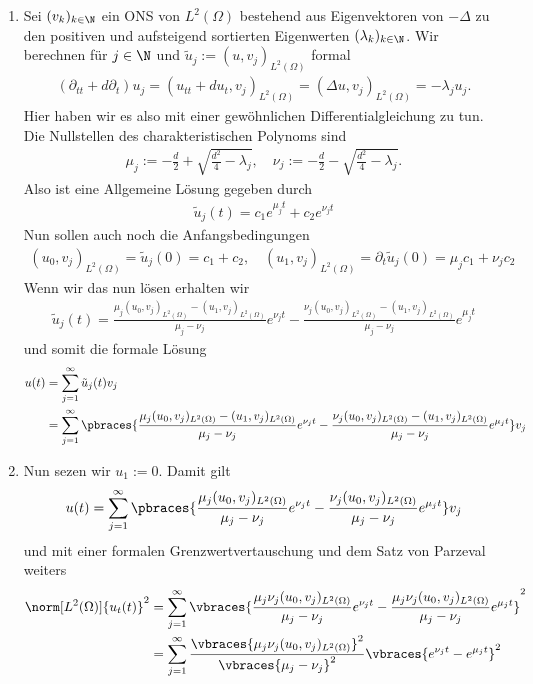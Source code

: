 \begin{solution}
\begin{enumerate}[label = (\roman*)]
    \item Sei $(v_k)_{k \in \N}$ ein ONS von $L^2(\Omega)$ bestehend aus Eigenvektoren von $- \Delta $ zu den positiven und aufsteigend sortierten Eigenwerten $(\lambda_k)_{k \in \N}$. Wir berechnen für $j \in \N$ und $\tilde{u}_j := (u,v_j)_{L^2(\Omega)}$ formal 
    \begin{align*}
    	(\partial_{tt} + d \partial_t)u_j = (u_{tt} + du_t, v_j)_{L^2(\Omega)} = (\Delta u, v_j)_{L^2(\Omega)} = -\lambda_j u_j.
    \end{align*}
	Hier haben wir es also mit einer gewöhnlichen Differentialgleichung zu tun. Die Nullstellen des charakteristischen Polynoms sind
	\begin{align*}
		\mu_j := - \frac{d}{2} + \sqrt{\frac{d^2}{4} - \lambda_j}, \quad \nu_j := - \frac{d}{2} - \sqrt{\frac{d^2}{4} - \lambda_j}.
	\end{align*}
	Also ist eine Allgemeine Lösung gegeben durch
	\begin{align*}
		\tilde{u}_j(t) = c_1 e^{\mu_j t} + c_2 e^{\nu_j t}
	\end{align*}
	Nun sollen auch noch die Anfangsbedingungen
	\begin{align*}
		(u_0, v_j)_{L^2(\Omega)} = \tilde{u}_j(0) = c_1 + c_2, \quad (u_1, v_j)_{L^2(\Omega)} = \partial_t \tilde{u}_j(0) = \mu_j c_1 + \nu_j c_2
	\end{align*}
	Wenn wir das nun lösen erhalten wir
	\begin{align*}
		\tilde{u}_j(t) = \frac{\mu_j(u_0, v_j)_{L^2(\Omega)} - (u_1, v_j)_{L^2(\Omega)}}{\mu_j - \nu_j} e^{\nu_j t} - \frac{\nu_j(u_0, v_j)_{L^2(\Omega)} - (u_1, v_j)_{L^2(\Omega)}}{\mu_j - \nu_j} e^{\mu_j t}
	\end{align*}
	und somit die formale Lösung
	\begin{align*}
		u(t) &= \sum_{j=1}^\infty \tilde{u}_j(t) v_j \\
		&= \sum_{j=1}^\infty \pbraces{\frac{\mu_j(u_0, v_j)_{L^2(\Omega)} - (u_1, v_j)_{L^2(\Omega)}}{\mu_j - \nu_j} e^{\nu_j t} - \frac{\nu_j(u_0, v_j)_{L^2(\Omega)} - (u_1, v_j)_{L^2(\Omega)}}{\mu_j - \nu_j} e^{\mu_j t}} v_j
	\end{align*}
	
	\item Nun sezen wir $u_1 := 0$. Damit gilt 
	\begin{align*}
		u(t) = \sum_{j=1}^\infty \pbraces{\frac{\mu_j(u_0, v_j)_{L^2(\Omega)}}{\mu_j - \nu_j} e^{\nu_j t} - \frac{\nu_j(u_0, v_j)_{L^2(\Omega)}}{\mu_j - \nu_j} e^{\mu_j t}} v_j
	\end{align*}
	und mit einer formalen Grenzwertvertauschung und dem Satz von Parzeval weiters
	\begin{align*}
		\norm[L^2(\Omega)]{u_t(t)}^2 &= \sum_{j=1}^\infty \vbraces{\frac{\mu_j\nu_j(u_0, v_j)_{L^2(\Omega)}}{\mu_j - \nu_j} e^{\nu_j t} - \frac{\mu_j\nu_j(u_0, v_j)_{L^2(\Omega)}}{\mu_j - \nu_j} e^{\mu_j t}}^2 \\
		&= \sum_{j=1}^\infty \frac{\vbraces{\mu_j\nu_j(u_0, v_j)_{L^2(\Omega)}}^2}{\vbraces{\mu_j - \nu_j}^2} \vbraces{e^{\nu_j t} - e^{\mu_j t}}^2
	\end{align*}
\end{enumerate}
    

\end{solution}
